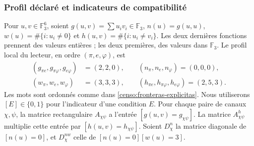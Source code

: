 \subsubsection{Profil déclaré et indicateurs de compatibilité}

Pour \(u,v\in\mathbb F_3^6\), soient
\(g(u,v)=\sum u_iv_i\in\mathbb F_3\),
\(n(u)=g(u,u)\), \(w(u)=\#\{i:u_i\ne0\}\) et
\(h(u,v)=\#\{i:u_i\ne v_i\}\). Les deux dernières fonctions prennent
des valeurs entières ; les deux premières, des valeurs dans \(\mathbb F_3\).
Le profil local du lecteur, en ordre \((\pi,e,\varphi)\), est
\begin{equation}
 \begin{split}
 (g_{\pi e},g_{\pi\varphi},g_{e\varphi})&=(2,2,0),\qquad
 (n_\pi,n_e,n_\varphi)=(0,0,0),\\
 (w_\pi,w_e,w_\varphi)&=(3,3,3),\qquad
 (h_{\pi e},h_{\pi\varphi},h_{e\varphi})=(2,5,3).
 \end{split}
 \label{censo:perfil-local}
\end{equation}
Les mots sont ordonnés comme dans \eqref{censo:fronteras-explicitas}.
Nous utiliserons \([E]\in\{0,1\}\) pour l'indicateur d'une condition \(E\).
Pour chaque paire de canaux \(\chi,\psi\), la matrice rectangulaire
\(A_{\chi\psi}\) a l'entrée \([g(u,v)=g_{\chi\psi}]\).
La matrice \(A^{h}_{\chi\psi}\) multiplie cette entrée par
\([h(u,v)=h_{\chi\psi}]\). Soient \(D_\chi^n\) la matrice diagonale
de \([n(u)=0]\), et \(D_\chi^{nw}\) celle de
\([n(u)=0][w(u)=3]\).

